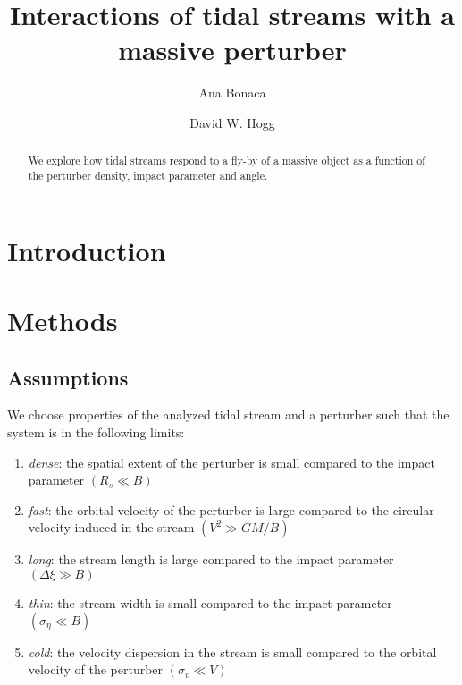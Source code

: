 \documentclass[modern]{aastex62}
\begin{document}
\sloppy\sloppypar\raggedbottom\frenchspacing %

\title{Interactions of tidal streams with a massive perturber}


\author[0000-0002-7846-9787]{Ana Bonaca}

\author[0000-0003-2866-9403]{David W. Hogg}

\begin{abstract}\noindent %
We explore how tidal streams respond to a fly-by of a massive object as a function of the perturber density, impact parameter and angle.
\end{abstract}


\section{Introduction}


\section{Methods}
\subsection{Assumptions}
We choose properties of the analyzed tidal stream and a perturber such that the system is in the following limits:
\begin{enumerate}
 \item{\emph{dense}: the spatial extent of the perturber is small compared to the impact parameter $(R_s\ll B)$
 }
 \item{\emph{fast}: the orbital velocity of the perturber is large compared to the circular velocity induced in the stream $(V^2\gg GM/B)$
 }
 \item{\emph{long}: the stream length is large compared to the impact parameter $(\Delta\xi\gg B)$
 }
 \item{\emph{thin}: the stream width is small compared to the impact parameter $(\sigma_\eta\ll B)$
 }
 \item{\emph{cold}: the velocity dispersion in the stream is small compared to the orbital velocity of the perturber $(\sigma_v\ll V)$
 }
\end{enumerate}
\end{document}
